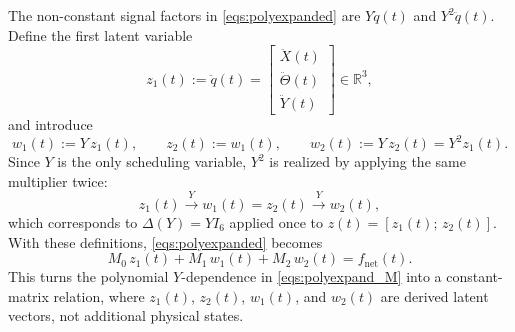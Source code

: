 \documentclass[11pt]{article}
\newcommand{\R}{\mathbb{R}}
\begin{document}
The non-constant signal factors in \eqref{eqs:polyexpanded} are $Y\ddot{q}(t)$
and $Y^2\ddot{q}(t)$. Define the first latent variable
\begin{equation}
    z_1(t) := \ddot{q}(t) =
    \begin{bmatrix}
        \ddot{X}(t) \\
        \ddot{\Theta}(t) \\
        \ddot{Y}(t)
    \end{bmatrix} \in \R^3,
    \label{eqs:z1def}
\end{equation}
and introduce
\begin{equation}
    w_1(t) := Y\,z_1(t),
    \qquad
    z_2(t) := w_1(t),
    \qquad
    w_2(t) := Y\,z_2(t) = Y^2 z_1(t).
    \label{eqs:zwdefs}
\end{equation}
Since $Y$ is the only scheduling variable, $Y^2$ is realized by applying the same multiplier twice:
\begin{equation}
    z_1(t) \xrightarrow{\,Y\,} w_1(t) = z_2(t) \xrightarrow{\,Y\,} w_2(t),
    \label{eqs:Ychain}
\end{equation}
which corresponds to $\Delta(Y) = Y I_6$ applied once to $z(t) = [z_1(t);\, z_2(t)]$.
With these definitions, \eqref{eqs:polyexpanded} becomes
\begin{equation}
    M_0\,z_1(t) + M_1\,w_1(t) + M_2\,w_2(t) = f_{\mathrm{net}}(t).
    \label{eqs:constantrewrite}
\end{equation}
This turns the polynomial $Y$-dependence in \eqref{eqs:polyexpand_M} into a constant-matrix
relation, where $z_1(t)$, $z_2(t)$, $w_1(t)$, and $w_2(t)$ are derived latent vectors, not
additional physical states.
\end{document}
